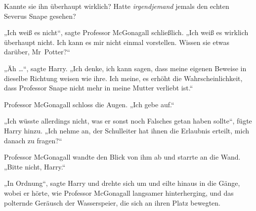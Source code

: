 
Kannte sie ihn überhaupt wirklich? Hatte \emph{irgendjemand} jemals den echten Severus Snape gesehen?

\later

„Ich weiß es nicht“, sagte Professor McGonagall schließlich.
„Ich weiß es wirklich überhaupt nicht. Ich kann es mir nicht einmal vorstellen. Wissen sie etwas darüber, Mr~Potter?“

„Äh …“, sagte Harry.
„Ich denke, ich kann sagen, dass meine eigenen Beweise in dieselbe Richtung weisen wie ihre. Ich meine, es erhöht die Wahrscheinlichkeit, dass Professor Snape nicht mehr in meine Mutter verliebt ist.“

Professor McGonagall schloss die Augen.
„Ich gebe auf.“

„Ich wüsste allerdings nicht, was er sonst noch Falsches getan haben sollte“, fügte Harry hinzu.
„Ich nehme an, der Schulleiter hat ihnen die Erlaubnis erteilt, mich danach zu fragen?“

Professor McGonagall wandte den Blick von ihm ab und starrte an die Wand.
„Bitte nicht, Harry.“

„In Ordnung“, sagte Harry und drehte sich um und eilte hinaus in die Gänge, wobei er hörte, wie Professor McGonagall langsamer hinterherging, und das polternde Geräusch der Wasserspeier, die sich an ihren Platz bewegten.

\later

